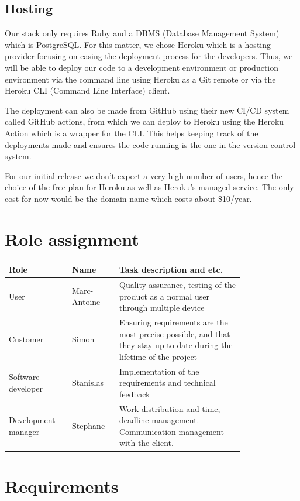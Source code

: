 \documentclass[conference]{IEEEtran}
\begin{document}
\subsection{Hosting}

Our stack only requires Ruby and a DBMS (Database Management System) which is PostgreSQL. For this matter, we chose Heroku which is a hosting provider focusing on easing the deployment process for the developers. Thus, we will be able to deploy our code to a development environment or production environment via the command line using Heroku as a Git remote or via the Heroku CLI (Command Line Interface) client.

The deployment can also be made from GitHub using their new CI/CD system called GitHub actions, from which we can deploy to Heroku using the Heroku Action which is a wrapper for the CLI. This helps keeping track of the deployments made and ensures the code running is the one in the version control system.

For our initial release we don't expect a very high number of users, hence the choice of the free plan for Heroku as well as Heroku's managed service. The only cost for now would be the domain name which costs about \$10/year.


\section{Role assignment}

\begin{tabular}{ |p{0.2\linewidth}|p{0.15\linewidth}|p{0.45\linewidth}| }
\hline
Role & Name & Task description and etc. \\
\hline
User & Marc-Antoine & Quality assurance, testing of the product as a normal user through multiple device \\
\hline
Customer & Simon & Ensuring requirements are the most precise possible, and that they stay up to date during the lifetime of the project \\
\hline
Software developer & Stanislas & Implementation of the requirements and technical feedback \\
\hline
Development manager & Stephane & Work distribution and time, deadline management. Communication management with the client. \\
\hline
\end{tabular}

\section{Requirements}
\end{document}
